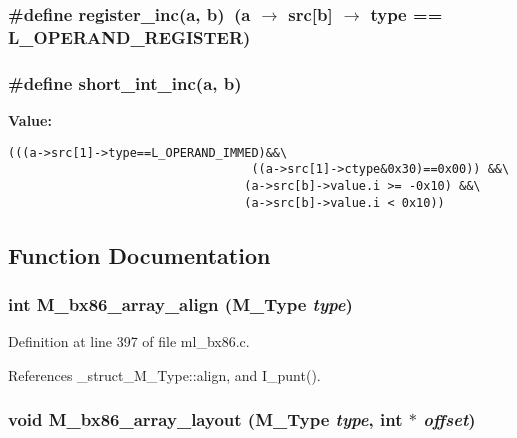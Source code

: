 \subsubsection{\setlength{\rightskip}{0pt plus 5cm}\#define register\_\-inc(a, b)~(a $\rightarrow$ src[b] $\rightarrow$ type == L\_\-OPERAND\_\-REGISTER)}\label{ml__bx86_8c_1e7b7d7ff33cab42b74ae66e888b1124}


\subsubsection{\setlength{\rightskip}{0pt plus 5cm}\#define short\_\-int\_\-inc(a, b)}\label{ml__bx86_8c_beca719e984ec0dc73106055269cd986}


\textbf{Value:}

\begin{Code}\begin{verbatim}(((a->src[1]->type==L_OPERAND_IMMED)&&\
                                  ((a->src[1]->ctype&0x30)==0x00)) &&\
                                 (a->src[b]->value.i >= -0x10) &&\
                                 (a->src[b]->value.i < 0x10))
\end{verbatim}\end{Code}


\subsection{Function Documentation}
\subsubsection{\setlength{\rightskip}{0pt plus 5cm}int M\_\-bx86\_\-array\_\-align (\bf{M\_\-Type} {\em type})}\label{ml__bx86_8c_984b65e8f07a16bffcbf301daf34f0eb}




Definition at line 397 of file ml\_\-bx86.c.

References \_\-struct\_\-M\_\-Type::align, and I\_\-punt().
\subsubsection{\setlength{\rightskip}{0pt plus 5cm}void M\_\-bx86\_\-array\_\-layout (\bf{M\_\-Type} {\em type}, int $\ast$ {\em offset})}\label{ml__bx86_8c_ccb320055614dea9baf9942c8dbd0053}




